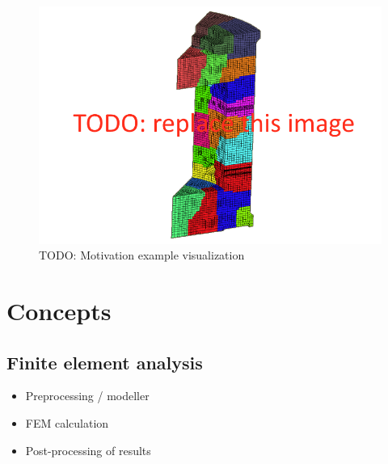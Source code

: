 \begin{figure}[H]
\centering
\includegraphics[width=\textwidth]{figures/motivation-example}
\decoRule
\caption[TODO: ]{TODO: Motivation example visualization}
\label{fig:motivation-example}
\end{figure}


\section{Concepts}




\subsection{Finite element analysis}



\begin{itemize}
    \item Preprocessing / modeller
    \item FEM calculation
    \item Post-processing of results
\end{itemize}

